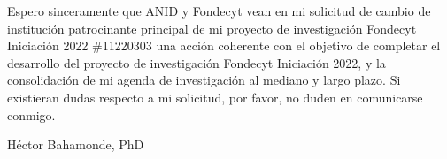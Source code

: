 \documentclass[9pt,stdletter,dateno,sigleft,openany]{newlfm} %
\begin{document}
\begin{newlfm}
Espero sinceramente que ANID y Fondecyt vean en mi solicitud de cambio de instituci\'on patrocinante principal de mi proyecto de investigaci\'on Fondecyt Iniciaci\'on 2022 \#11220303 una acci\'on coherente con el objetivo de completar el desarrollo del proyecto de investigaci\'on Fondecyt Iniciaci\'on 2022, y la consolidaci\'on de mi agenda de investigaci\'on al mediano y largo plazo. Si existieran dudas respecto a mi solicitud, por favor, no duden en comunicarse conmigo.

{\vspace{3cm}\hspace{10cm}H\'ector Bahamonde, PhD}


\end{newlfm}
\end{document}
